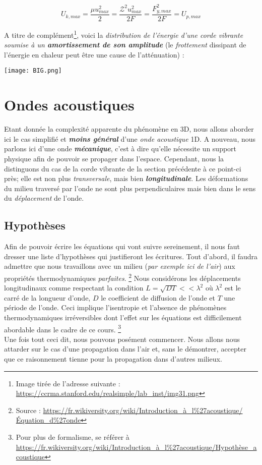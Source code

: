 \[ U_{k,max} = \frac{\mu u_{max}^{2}}{2} =   \frac{\mathcal{Z}^{2} u_{max}^{2}}{2F} = \frac{F_{y,max}^{2}}{2F} = U_{p,max}\]

A titre de complément\footnote{Image tirée de l'adresse suivante : \url{https://ccrma.stanford.edu/realsimple/lab_inst/img31.png}}, voici la \textit{distribution de l'énergie d'une corde vibrante soumise à un \textbf{amortissement de son amplitude}} (le \textit{frottement }dissipant de l'énergie en chaleur peut être une cause de l'atténuation) : 
\begin{center}
	\texttt{[image: BIG.png]}
\end{center}

\section{Ondes acoustiques}

Etant donnée la complexité apparente du phénomène en 3D, nous allons aborder ici le cas simplifié et \textit{\textbf{moins général}} d'une 
\textit{onde acoustique} 1D. A nouveau, nous parlons ici d'une onde \textit{\textbf{mécanique}}, c'est à dire qu'elle nécessite un support physique afin 
de pouvoir se propager dans l'espace. Cependant, nous la distinguons du cas de la corde vibrante de la section précédente à ce point-ci près; 
elle est non plus \textit{transversale}, mais bien \textit{\textbf{longitudinale}}. Les déformations du milieu traversé par l'onde ne sont plus perpendiculaires mais 
bien dans le sens du
\textit{déplacement}
de l'onde.

\subsection{Hypothèses}

Afin de pouvoir écrire les équations qui vont suivre sereinement, il nous faut dresser une liste d'hypothèses qui justifieront les écritures. 
Tout d'abord, il faudra admettre que nous travaillons avec un milieu (\textit{par exemple ici de l'air}) aux propriétés thermodynamiques \textit{parfaites}. \footnote{Source : \url{https://fr.wikiversity.org/wiki/Introduction_à_l\%27acoustique/Équation_d\%27onde}}
Nous considérons les déplacements longitudinaux comme respectant la condition $L = \sqrt{DT} << \lambda^{2}$ où $\lambda^{2}$ est le carré de la longueur d'onde, $D$ le coefficient de diffusion de l'onde et 
$T$ une période de l'onde. Ceci implique l'isentropie et l'absence de phénomènes thermodynamiques irréversibles dont l'effet sur les équations est difficilement abordable dans le cadre de ce cours. \footnote{Pour plus de formalisme, se référer à \url{https://fr.wikiversity.org/wiki/Introduction_à_l\%27acoustique/Hypothèse_acoustique}} \\ 
Une fois tout ceci dit, nous pouvons posément commencer. Nous allons nous attarder sur le cas d'une propagation dans l'air et, sans le démontrer, accepter que ce raisonnement tienne pour la propagation dans 
d'autres milieux.

